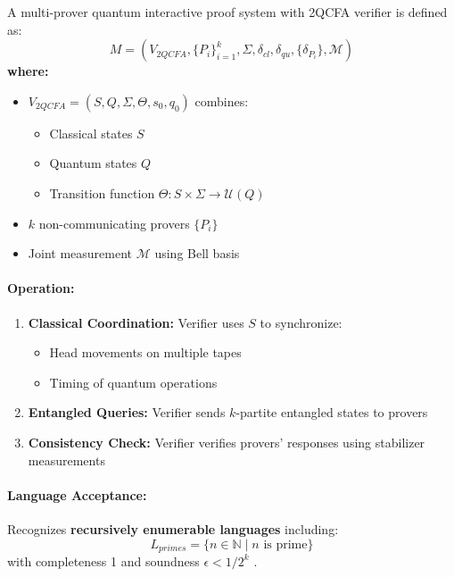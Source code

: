 \begin{definition}
A multi-prover quantum interactive proof system with 2QCFA verifier is defined as:
\[
M = (V_{2QCFA}, \{P_i\}_{i=1}^k, \Sigma, \delta_{cl}, \delta_{qu}, \{\delta_{P_i}\}, \mathcal{M})
\]
\textbf{where:}
\begin{itemize}
    \item $V_{2QCFA} = (S, Q, \Sigma, \Theta, s_0, q_0)$ combines:
    \begin{itemize}
        \item Classical states $S$
        \item Quantum states $Q$
        \item Transition function $\Theta: S \times \Sigma \rightarrow \mathcal{U}(Q)$
    \end{itemize}
    \item $k$ non-communicating provers $\{P_i\}$
    \item Joint measurement $\mathcal{M}$ using Bell basis
\end{itemize}
\end{definition}

\paragraph{Operation:}
\begin{enumerate}
    \item \textbf{Classical Coordination:} Verifier uses $S$ to synchronize:
    \begin{itemize}
        \item Head movements on multiple tapes
        \item Timing of quantum operations
    \end{itemize}
    \item \textbf{Entangled Queries:} Verifier sends $k$-partite entangled states to provers
    \item \textbf{Consistency Check:} Verifier verifies provers' responses using stabilizer measurements
\end{enumerate}

\paragraph{Language Acceptance:}
Recognizes \textbf{recursively enumerable languages} including:
\[
L_{primes} = \{n \in \mathbb{N} \mid n \text{ is prime}\}
\]
with completeness 1 and soundness $\epsilon < 1/2^k$ \cite{shor1999polynomial}.

